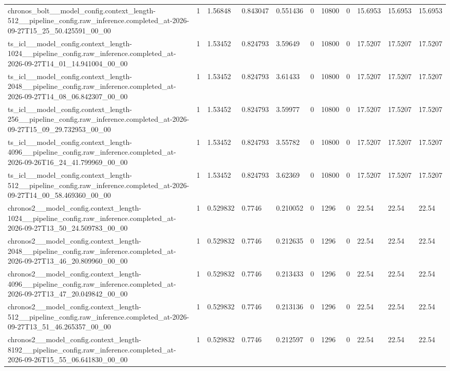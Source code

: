 \begin{tabular}{lllllllllll}
chronos\_bolt\_\_model\_config.context\_length-512\_\_pipeline\_config.raw\_inference.completed\_at-2026-09-27T15\_25\_50.425591\_00\_00 & 1 & 1.56848 & 0.843047 & 0.551436 & 0 & 10800 & 0 & 15.6953 & 15.6953 & 15.6953 \\
ts\_icl\_\_model\_config.context\_length-1024\_\_pipeline\_config.raw\_inference.completed\_at-2026-09-27T14\_01\_14.941004\_00\_00 & 1 & 1.53452 & 0.824793 & 3.59649 & 0 & 10800 & 0 & 17.5207 & 17.5207 & 17.5207 \\
ts\_icl\_\_model\_config.context\_length-2048\_\_pipeline\_config.raw\_inference.completed\_at-2026-09-27T14\_08\_06.842307\_00\_00 & 1 & 1.53452 & 0.824793 & 3.61433 & 0 & 10800 & 0 & 17.5207 & 17.5207 & 17.5207 \\
ts\_icl\_\_model\_config.context\_length-256\_\_pipeline\_config.raw\_inference.completed\_at-2026-09-27T15\_09\_29.732953\_00\_00 & 1 & 1.53452 & 0.824793 & 3.59977 & 0 & 10800 & 0 & 17.5207 & 17.5207 & 17.5207 \\
ts\_icl\_\_model\_config.context\_length-4096\_\_pipeline\_config.raw\_inference.completed\_at-2026-09-26T16\_24\_41.799969\_00\_00 & 1 & 1.53452 & 0.824793 & 3.55782 & 0 & 10800 & 0 & 17.5207 & 17.5207 & 17.5207 \\
ts\_icl\_\_model\_config.context\_length-512\_\_pipeline\_config.raw\_inference.completed\_at-2026-09-27T14\_00\_58.469360\_00\_00 & 1 & 1.53452 & 0.824793 & 3.62369 & 0 & 10800 & 0 & 17.5207 & 17.5207 & 17.5207 \\
chronos2\_\_model\_config.context\_length-1024\_\_pipeline\_config.raw\_inference.completed\_at-2026-09-27T13\_50\_24.509783\_00\_00 & 1 & 0.529832 & 0.7746 & 0.210052 & 0 & 1296 & 0 & 22.54 & 22.54 & 22.54 \\
chronos2\_\_model\_config.context\_length-2048\_\_pipeline\_config.raw\_inference.completed\_at-2026-09-27T13\_46\_20.809960\_00\_00 & 1 & 0.529832 & 0.7746 & 0.212635 & 0 & 1296 & 0 & 22.54 & 22.54 & 22.54 \\
chronos2\_\_model\_config.context\_length-4096\_\_pipeline\_config.raw\_inference.completed\_at-2026-09-27T13\_47\_20.049842\_00\_00 & 1 & 0.529832 & 0.7746 & 0.213433 & 0 & 1296 & 0 & 22.54 & 22.54 & 22.54 \\
chronos2\_\_model\_config.context\_length-512\_\_pipeline\_config.raw\_inference.completed\_at-2026-09-27T13\_51\_46.265357\_00\_00 & 1 & 0.529832 & 0.7746 & 0.213136 & 0 & 1296 & 0 & 22.54 & 22.54 & 22.54 \\
chronos2\_\_model\_config.context\_length-8192\_\_pipeline\_config.raw\_inference.completed\_at-2026-09-26T15\_55\_06.641830\_00\_00 & 1 & 0.529832 & 0.7746 & 0.212597 & 0 & 1296 & 0 & 22.54 & 22.54 & 22.54 \\

\end{tabular}
